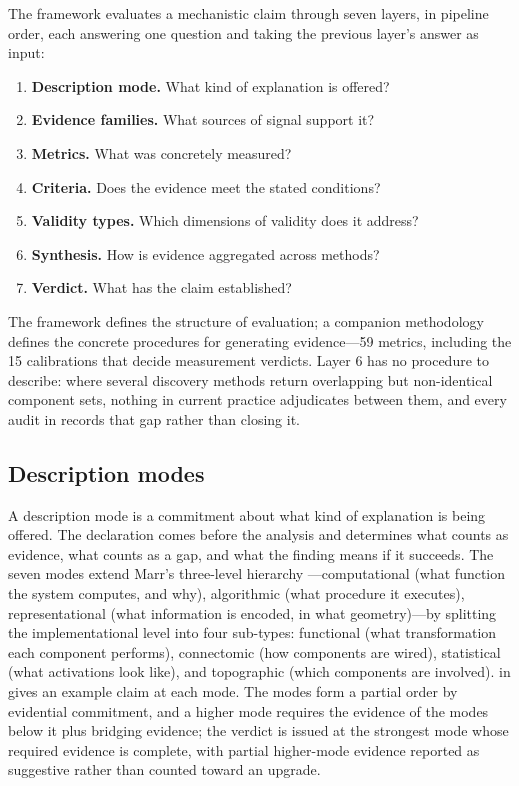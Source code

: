 \documentclass{article}
\begin{document}
The framework evaluates a mechanistic claim through seven layers, in pipeline order, each answering one question and taking the previous layer's answer as input:
\begin{enumerate}[nosep,leftmargin=*]
\item \textbf{Description mode.} What kind of explanation is offered?
\item \textbf{Evidence families.} What sources of signal support it?
\item \textbf{Metrics.} What was concretely measured?
\item \textbf{Criteria.} Does the evidence meet the stated conditions?
\item \textbf{Validity types.} Which dimensions of validity does it address?
\item \textbf{Synthesis.} How is evidence aggregated across methods?
\item \textbf{Verdict.} What has the claim established?
\end{enumerate}
The framework defines the structure of evaluation; a companion methodology defines the concrete procedures for generating evidence---59 metrics, including the 15 calibrations that decide measurement verdicts. Layer 6 has no procedure to describe: where several discovery methods return overlapping but non-identical component sets, nothing in current practice adjudicates between them, and every audit in  records that gap rather than closing it.

\subsection{Description modes}
\label{sec:description-modes}

A description mode is a commitment about what kind of explanation is being offered. The declaration comes before the analysis and determines what counts as evidence, what counts as a gap, and what the finding means if it succeeds. The seven modes extend Marr's three-level hierarchy \citep{marr1982vision}---computational (what function the system computes, and why), algorithmic (what procedure it executes), representational (what information is encoded, in what geometry)---by splitting the implementational level into four sub-types: functional (what transformation each component performs), connectomic (how components are wired), statistical (what activations look like), and topographic (which components are involved).  in  gives an example claim at each mode. The modes form a partial order by evidential commitment, and a higher mode requires the evidence of the modes below it plus bridging evidence; the verdict is issued at the strongest mode whose required evidence is complete, with partial higher-mode evidence reported as suggestive rather than counted toward an upgrade.
\end{document}

